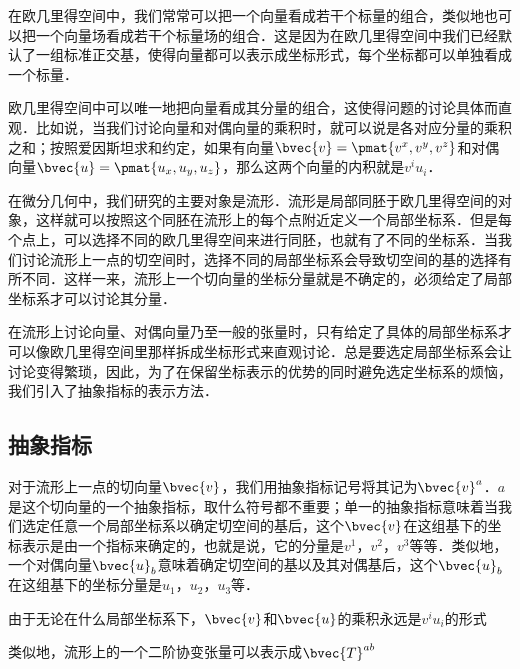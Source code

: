 
\begin{issues}
\issueTODO
\end{issues}



在欧几里得空间中，我们常常可以把一个向量看成若干个标量的组合，类似地也可以把一个向量场看成若干个标量场的组合．这是因为在欧几里得空间中我们已经默认了一组标准正交基，使得向量都可以表示成坐标形式，每个坐标都可以单独看成一个标量．

欧几里得空间中可以唯一地把向量看成其分量的组合，这使得问题的讨论具体而直观．比如说，当我们讨论向量和对偶向量的乘积时，就可以说是各对应分量的乘积之和；按照爱因斯坦求和约定，如果有向量$\bvec{v}=\pmat{v^x, v^y, v^z}$和对偶向量$\bvec{u}=\pmat{u_x, u_y, u_z}$，那么这两个向量的内积就是$v^iu_i$．

在微分几何中，我们研究的主要对象是流形．流形是局部同胚于欧几里得空间的对象，这样就可以按照这个同胚在流形上的每个点附近定义一个局部坐标系．但是每个点上，可以选择不同的欧几里得空间来进行同胚，也就有了不同的坐标系．当我们讨论流形上一点的切空间时，选择不同的局部坐标系会导致切空间的基的选择有所不同．这样一来，流形上一个切向量的坐标分量就是不确定的，必须给定了局部坐标系才可以讨论其分量．

在流形上讨论向量、对偶向量乃至一般的张量时，只有给定了具体的局部坐标系才可以像欧几里得空间里那样拆成坐标形式来直观讨论．总是要选定局部坐标系会让讨论变得繁琐，因此，为了在保留坐标表示的优势的同时避免选定坐标系的烦恼，我们引入了抽象指标的表示方法．




\subsection{抽象指标}

对于流形上一点的切向量$\bvec{v}$，我们用抽象指标记号将其记为$\bvec{v}^a$．$a$是这个切向量的一个抽象指标，取什么符号都不重要；单一的抽象指标意味着当我们选定任意一个局部坐标系以确定切空间的基后，这个$\bvec{v}$在这组基下的坐标表示是由一个指标来确定的，也就是说，它的分量是$v^1$，$v^2$，$v^3$等等．类似地，一个对偶向量$\bvec{u}_b$意味着确定切空间的基以及其对偶基后，这个$\bvec{u}_b$在这组基下的坐标分量是$u_1$，$u_2$，$u_3$等．

由于无论在什么局部坐标系下，$\bvec{v}$和$\bvec{u}$的乘积永远是$v^iu_i$的形式

类似地，流形上的一个二阶协变张量可以表示成$\bvec{T}^{ab}$





